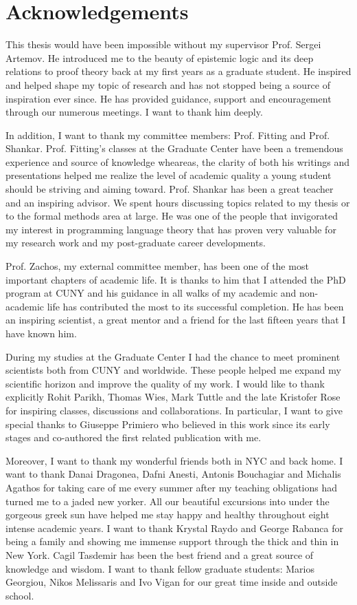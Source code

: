 \section*{Acknowledgements}
This thesis would have been impossible without my supervisor Prof. Sergei Artemov.
He introduced me to the beauty of epistemic logic and its deep relations to proof theory
back at my first years as a graduate student. He inspired and helped shape my topic of research and 
has not stopped being a source of inspiration ever
since. He has provided guidance, support and encouragement through our numerous meetings. 
I want to thank him deeply.

In addition, I want to thank my committee members: Prof. Fitting and Prof. Shankar. Prof. Fitting's classes
 at the Graduate Center have been a tremendous experience and source of knowledge wheareas,
the clarity of  both his writings and presentations helped me realize the 
level of academic quality a young student should be striving and aiming toward. Prof. Shankar has
been a great teacher and an inspiring advisor. We spent hours 
discussing topics related to my thesis or to the formal methods area at large. He was one
of the people that invigorated my interest in programming language theory that has
proven very valuable for my research work and my post-graduate career developments.

Prof. Zachos, my external committee member, has been one of the most important
chapters of academic life. It is thanks to him that I attended the PhD program at CUNY
and his guidance in all walks of my academic and non-academic life has contributed 
the most  to its successful completion. He has been an inspiring
scientist, a great mentor and a friend for the last fifteen years that I have 
known him. 

During my studies at the Graduate Center I had the chance to meet 
prominent scientists both from CUNY and worldwide. 
These people helped me expand my scientific horizon and improve
the quality of my work. I would like to thank explicitly Rohit Parikh, Thomas Wies,  
 Mark Tuttle and the late Kristofer Rose for inspiring classes, discussions and collaborations.
In particular, I want to give special thanks to Giuseppe Primiero who believed in this work
since its early stages and co-authored the first related publication with me.

Moreover, I want to thank my wonderful friends both in NYC and back home. I want to thank Danai Dragonea, Dafni Anesti, Antonis Bouchagiar 
and Michalis Agathos for taking care of me every summer after my teaching obligations
had turned me to a jaded new yorker. All our beautiful excursions into under the gorgeous
greek sun have helped me stay happy and healthy throughout eight intense academic years.
I want to thank Krystal Raydo and George Rabanca for being a family and showing me immense support
through the thick and thin in New York. 
Cagil Tasdemir has been the best friend and a great source of knowledge and wisdom.
I want to thank fellow graduate students: Marios Georgiou,
Nikos Melissaris and Ivo Vigan for our great time inside and outside school.

